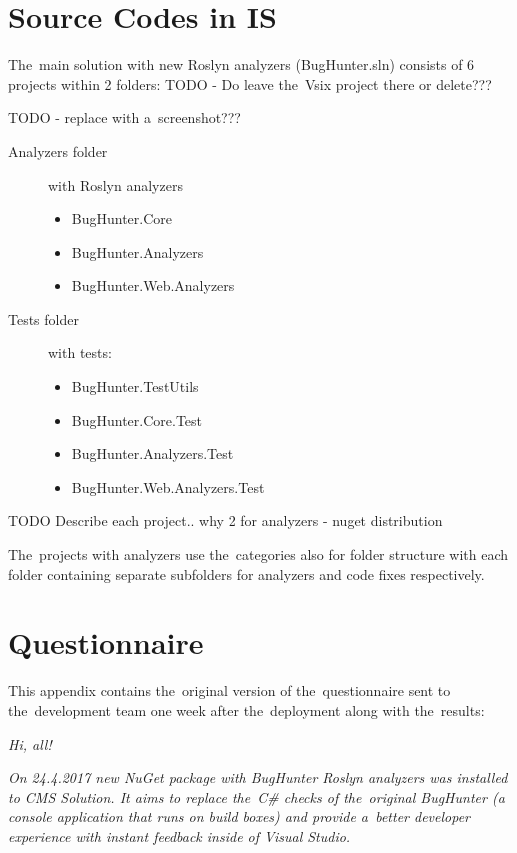 \documentclass[
  digital, %
  table,   %
  lof,     %
  lot,     %
  oneside,
]{fithesis3}
\begin{document}
\chapter{Source Codes in IS}
\label{appendix:source-codes}
  The~main solution with new Roslyn analyzers (BugHunter.sln) consists of 6 projects within 2 folders: TODO - Do leave the~Vsix project there or delete???

TODO - replace with a~screenshot???
\begin{description}
  \item[Analyzers folder] with Roslyn analyzers
  \begin{itemize}
    \item BugHunter.Core
    \item BugHunter.Analyzers
    \item BugHunter.Web.Analyzers
  \end{itemize}
  
  \item[Tests folder] with tests:
  \begin{itemize}
    \item BugHunter.TestUtils
    \item BugHunter.Core.Test
    \item BugHunter.Analyzers.Test
    \item BugHunter.Web.Analyzers.Test
  \end{itemize}
\end{description}

TODO Describe each project.. why 2 for analyzers - nuget distribution

The~projects with analyzers use the~categories also for folder structure with each folder containing separate subfolders for analyzers and code fixes respectively.


\chapter{Questionnaire}
\label{appendix:questionnaire}
This appendix contains the~original version of the~questionnaire sent to the~development team one week after the~deployment along with the~results:

\bigskip\noindent
\textit{Hi, all!}

\bigskip\noindent
\textit{On 24.4.2017 new NuGet package with BugHunter Roslyn analyzers was installed to CMS Solution. It aims to replace the~C\# checks of the~original BugHunter (a console application that runs on build boxes) and provide a~better developer experience with instant feedback inside of Visual Studio.}
\end{document}
